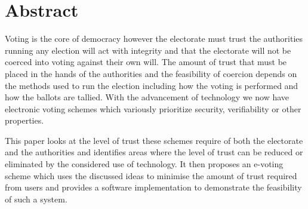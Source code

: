 \newpage
\vspace*{\fill}

\section*{Abstract}

Voting is the core of democracy however the electorate must trust the authorities running any election will act with integrity and that the electorate will not be coerced into voting against their own will.
The amount of trust that must be placed in the hands of the authorities and the feasibility of coercion depends on the methods used to run the election including how the voting is performed and how the ballots are tallied.
With the advancement of technology we now have electronic voting schemes which variously prioritize security, verifiability or other properties.

This paper looks at the level of trust these schemes require of both the electorate and the authorities and identifies areas where the level of trust can be reduced or eliminated by the considered use of technology.
It then proposes an e-voting scheme which uses the discussed ideas to minimise the amount of trust required from users and provides a software implementation to demonstrate the feasibility of such a system.

\vspace*{\fill}
